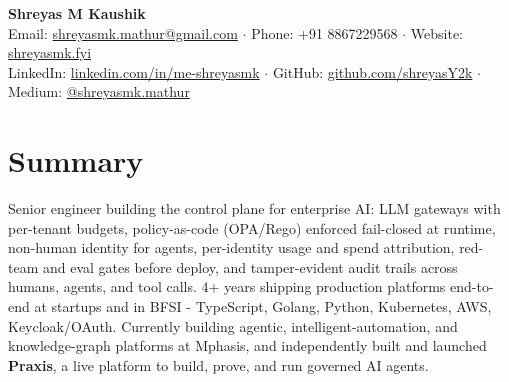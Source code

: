 \documentclass[a4paper,11pt]{article}
\begin{document}
\begin{center}
  {\LARGE \textbf{Shreyas M Kaushik}} \\ \vspace{4pt}
  \small
  Email: \href{mailto:shreyasmk.mathur@gmail.com}{shreyasmk.mathur@gmail.com} $\cdot$
  Phone: +91 8867229568 $\cdot$
  Website: \href{https://shreyasmk.fyi}{shreyasmk.fyi} \\ \vspace{2pt}
  LinkedIn: \href{https://linkedin.com/in/me-shreyasmk}{linkedin.com/in/me-shreyasmk} $\cdot$
  GitHub: \href{https://github.com/shreyasY2k}{github.com/shreyasY2k} $\cdot$
  Medium: \href{https://medium.com/@shreyasmk.mathur}{@shreyasmk.mathur}
\end{center}

\section{Summary}
\small{
Senior engineer building the control plane for enterprise AI: LLM gateways with per-tenant budgets, policy-as-code (OPA/Rego) enforced fail-closed at runtime, non-human identity for agents, per-identity usage and spend attribution, red-team and eval gates before deploy, and tamper-evident audit trails across humans, agents, and tool calls. 4+ years shipping production platforms end-to-end at startups and in BFSI - TypeScript, Golang, Python, Kubernetes, AWS, Keycloak/OAuth. Currently building agentic, intelligent-automation, and knowledge-graph platforms at Mphasis, and independently built and launched \textbf{Praxis}, a live platform to build, prove, and run governed AI agents.
}

\end{document}
